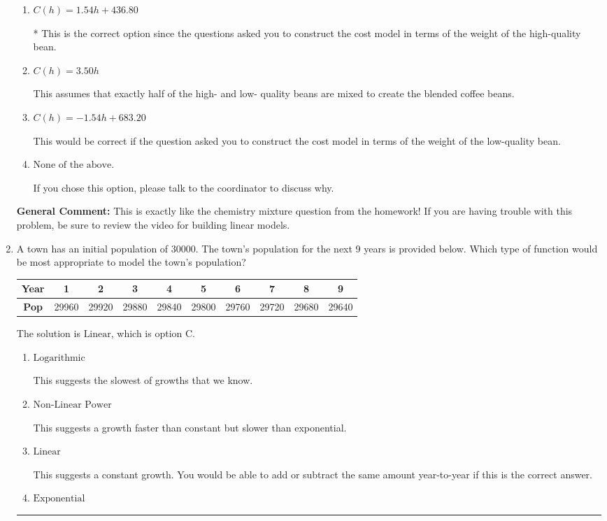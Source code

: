 \documentclass{extbook}[14pt]
\newcommand{\litem}[1]{\item #1

\rule{\textwidth}{0.4pt}}
\begin{document}
\begin{enumerate}
{\begin{enumerate}[label=\Alph*.]
This models the cost of the high-quality bean only, not the blended beans.
\item \( C(h) = 1.54 h + 436.80 \)

* This is the correct option since the questions asked you to construct the cost model in terms of the weight of the high-quality bean.
\item \( C(h) = 3.50 h \)

This assumes that exactly half of the high- and low- quality beans are mixed to create the blended coffee beans.
\item \( C(h) = -1.54 h + 683.20 \)

This would be correct if the question asked you to construct the cost model in terms of the weight of the low-quality bean.
\item \( \text{None of the above.} \)

If you chose this option, please talk to the coordinator to discuss why.
\end{enumerate}

\textbf{General Comment:} This is exactly like the chemistry mixture question from the homework! If you are having trouble with this problem, be sure to review the video for building linear models.
}
\litem{
A town has an initial population of 30000. The town's population for the next 9 years is provided below. Which type of function would be most appropriate to model the town's population?


\begin{tabular}{c|c|c|c|c|c|c|c|c|c}
\textbf{Year} &1 &2 &3 &4 &5 &6 &7 &8 &9\tabularnewline \hline
\textbf{Pop} &29960 &29920 &29880 &29840 &29800 &29760 &29720 &29680 &29640\end{tabular}The solution is \( \text{Linear} \), which is option C.\begin{enumerate}[label=\Alph*.]
\item \( \text{Logarithmic} \)

This suggests the slowest of growths that we know.
\item \( \text{Non-Linear Power} \)

This suggests a growth faster than constant but slower than exponential.
\item \( \text{Linear} \)

This suggests a constant growth. You would be able to add or subtract the same amount year-to-year if this is the correct answer.
\item \( \text{Exponential} \)


\end{enumerate}}
\end{enumerate}
\end{document}

